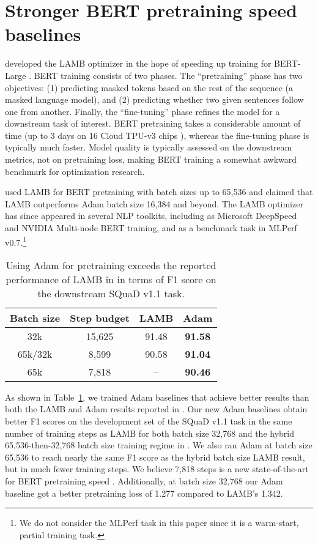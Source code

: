 \documentclass{article}
\begin{document}
\section{Stronger BERT pretraining speed baselines}\label{sec:bert}


\citet{you2019lamb} developed the LAMB optimizer in the hope of speeding up training for BERT-Large \citep[Bidirectional Encoder Representations from Transformers,][]{devlin2018bert}.
BERT training consists of two phases. The ``pretraining'' phase has two objectives: (1) predicting masked tokens based on the rest of the sequence (a masked language model), and (2) predicting whether two given sentences follow one from another. Finally, the ``fine-tuning'' phase refines the model for a downstream task of interest.  BERT pretraining takes a considerable amount of time (up to 3 days on 16 Cloud TPU-v3 chips \cite{jouppi2017datacenter}), whereas the fine-tuning phase is typically much faster. Model quality is typically assessed on the downstream metrics, not on pretraining loss, making BERT training a somewhat awkward benchmark for optimization research.

\citet{you2019lamb} used LAMB for BERT pretraining with batch sizes up to 65,536 and claimed that LAMB outperforms Adam batch size 16,384 and beyond. The LAMB optimizer has since appeared in several NLP toolkits, including as Microsoft DeepSpeed and NVIDIA Multi-node BERT training, and as a benchmark task in MLPerf v0.7.\footnote{We do not consider the MLPerf task in this paper since it is a warm-start, partial training task.} 

\begin{table}[t]
\centering
 \begin{tabular}{|c|c|c|c|}
\hline
Batch size & Step budget & LAMB & Adam \\
\hline
32k & 15,625 & 91.48 & \textbf{91.58} \\
\hline
65k/32k & 8,599 & 90.58 & \textbf{91.04} \\
\hline
65k & 7,818 & -- & \textbf{90.46} \\
\hline
\end{tabular}
\caption{Using Adam for pretraining exceeds the reported performance of LAMB in \citet{you2019lamb} in terms of F1 score on the downstream SQuaD v1.1 task.}
\label{table:bert-results}
\end{table}
As shown in Table~\ref{table:bert-results}, we trained Adam baselines that achieve better results than both the LAMB and Adam results reported in \citet{you2019lamb}. Our new Adam baselines obtain better F1 scores on the development set of the SQuaD v1.1 task in the same number of training steps as LAMB for both batch size 32,768 and the hybrid 65,536-then-32,768 batch size training regime in \citet{you2019lamb}. We also ran Adam at batch size 65,536 to reach nearly the same F1 score as the hybrid batch size LAMB result, but in much fewer training steps. We believe 7,818 steps is a new state-of-the-art for BERT pretraining speed \citep[in our experiments, it also improves upon the 76-minute record claimed in][]{you2019lamb}. Additionally, at batch size  32,768 our Adam baseline got a better pretraining loss of 1.277 compared to LAMB's 1.342.
\end{document}
